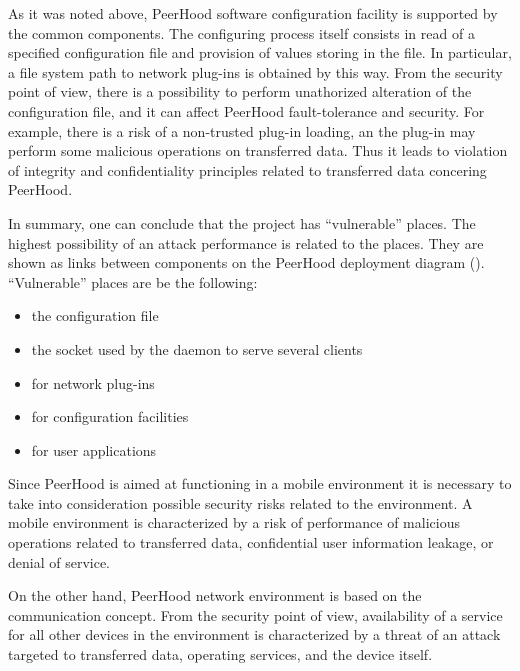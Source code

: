 %
As it was noted above, PeerHood software configuration facility is supported by the common components. 
%
The configuring process itself consists in read of a specified configuration file and provision of values storing in the file. 
%
In particular, a file system path to network plug-ins is obtained by this way. 
%
From the security point of view, there is a possibility to perform unathorized alteration of the configuration file, and it can affect PeerHood fault-tolerance and security. 
%
For example, there is a risk of a non-trusted plug-in loading, an the plug-in may perform some malicious operations on transferred data. 
%
Thus it leads to violation of integrity and confidentiality principles related to transferred data concering PeerHood. 

%
In summary, one can conclude that the project has ``vulnerable'' places. 
%
The highest possibility of an attack performance is related to the places. 
%
They are shown as links between components on the PeerHood deployment diagram (). 
%
``Vulnerable'' places are be the following:
\begin{itemize}
	\setlength{\itemsep}{0pt}%

	\item the configuration file
	\item the socket used by the daemon to serve several clients
	\item {} for network plug-ins
	\item {} for configuration facilities
	\item {} for user applications
\end{itemize}

%
Since PeerHood is aimed at functioning in a mobile environment it is necessary to take into consideration possible security risks related to the environment. 
%
A mobile environment is characterized by a risk of performance of malicious operations related to transferred data, confidential user information leakage, or denial of service. 

%
On the other hand, PeerHood network environment is based on the  communication concept. 
%
From the security point of view, availability of a service for all other devices in the environment is characterized by a threat of an attack targeted to transferred data, operating services, and the device itself. 

